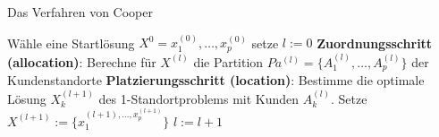           \begin{algorithm}[H]
            \begin{algorithmic}[1]
              \caption{Das Verfahren von Cooper}
              \State Wähle eine Startlösung $X^{0} = {x_1^{(0)}, \dots, x_p^{(0)}}$ setze $l := 0$
                \State \textbf{Zuordnungsschritt (allocation)}: Berechne für $X^{(l)}$ die Partition $Pa^{(l)} = \{A_1^{(l)}, \dots, A_p^{(l)}\}$ der Kundenstandorte
                \State \textbf{Platzierungsschritt (location)}: Bestimme die optimale Lösung $X_k^{(l+1)}$ des 1-Standortproblems mit Kunden $A_k^{(l)}$. Setze $X^{(l+1)}:= \{x_1^{(l+1), \dots, x_p^{(l+1)}}\}$
                \State $l:=l+1$
              \EndWhile
            \end{algorithmic}
          \end{algorithm}




        





